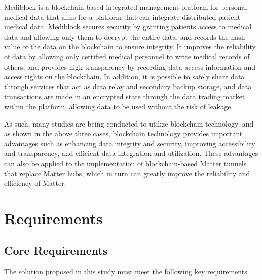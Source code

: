 \documentclass[conference]{IEEEtran}
\begin{document}
\begin{enumerate}[itemsep=2ex, parsep=1ex]
	      Mediblock is a blockchain-based integrated management platform for personal medical data that aims for a platform that can integrate distributed patient medical data. Mediblock secures security by granting patients access to medical data and allowing only them to decrypt the entire data, and records the hash value of the data on the blockchain to ensure integrity. It improves the reliability of data by allowing only certified medical personnel to write medical records of others, and provides high transparency by recording data access information and access rights on the blockchain. In addition, it is possible to safely share data through services that act as data relay and secondary backup storage, and data transactions are made in an encrypted state through the data trading market within the platform, allowing data to be used without the risk of leakage.
	              
	      As such, many studies are being conducted to utilize blockchain technology, and as shown in the above three cases, blockchain technology provides important advantages such as enhancing data integrity and security, improving accessibility and transparency, and efficient data integration and utilization. These advantages can also be applied to the implementation of blockchain-based Matter tunnels that replace Matter hubs, which in turn can greatly improve the reliability and efficiency of Matter.
\end{enumerate}

\section{Requirements}

\subsection{Core Requirements}
The solution proposed in this study must meet the following key requirements
\end{document}
